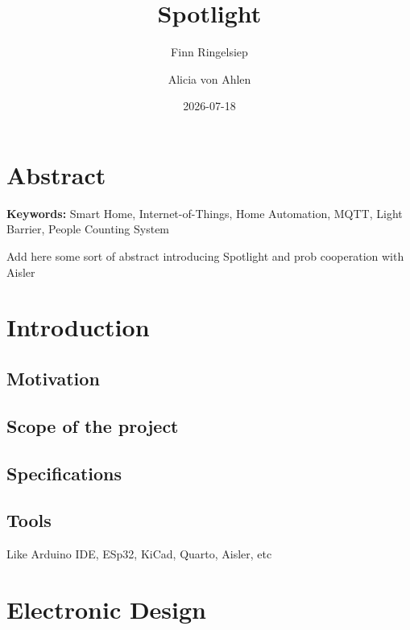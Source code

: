 \documentclass[
  letterpaper,
]{scrbook}
\title{Spotlight}
\author{Finn Ringelsiep \and Alicia von Ahlen}
\date{2026-07-18}
\renewcommand*\contentsname{Table of contents}
\newcommand\contentsname{Table of contents}
\begin{document}
\frontmatter
\maketitle

\renewcommand*\contentsname{Table of contents}
{
\hypersetup{linkcolor=}
\setcounter{tocdepth}{2}
\tableofcontents
}

\mainmatter
{}

\chapter*{Abstract}\label{abstract}


\textbf{Keywords:} Smart Home, Internet-of-Things, Home Automation,
MQTT, Light Barrier, People Counting System

Add here some sort of abstract introducing Spotlight and prob
cooperation with Aisler


\chapter{Introduction}\label{introduction}

\section{Motivation}\label{motivation}

\section{Scope of the project}\label{scope-of-the-project}

\section{Specifications}\label{specifications}

\section{Tools}\label{tools}

Like Arduino IDE, ESp32, KiCad, Quarto, Aisler, etc


\chapter{Electronic Design}\label{electronic-design}
\end{document}
